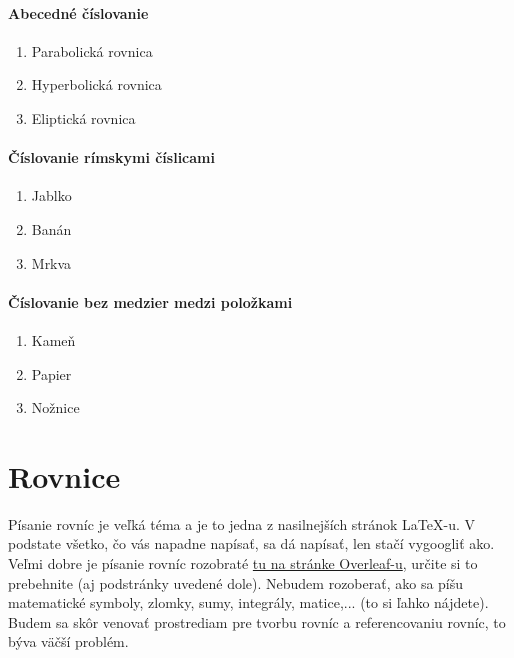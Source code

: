 \paragraph{Abecedné číslovanie}
\begin{enumerate}[label=\alph*)]
	\item Parabolická rovnica
	\item Hyperbolická rovnica
	\item Eliptická rovnica
\end{enumerate}

\paragraph{Číslovanie rímskymi číslicami}
\begin{enumerate}[label=\roman*)]
	\item Jablko
	\item Banán
	\item Mrkva
\end{enumerate}

\paragraph{Číslovanie bez medzier medzi položkami}
\begin{enumerate}
	\setlength{\itemsep}{0pt}
	\setlength{\parskip}{0pt}
	\item Kameň
	\item Papier
	\item Nožnice
\end{enumerate}

\section{Rovnice}
Písanie rovníc je veľká téma a je to jedna z nasilnejších stránok LaTeX-u. V podstate všetko, čo vás napadne napísať, sa dá napísať, len stačí vygoogliť ako. Veľmi dobre je písanie rovníc rozobraté \href{https://www.overleaf.com/learn/latex/Mathematical_expressions}{tu na stránke Overleaf-u}, určite si to prebehnite (aj podstránky uvedené dole). Nebudem rozoberať, ako sa píšu matematické symboly, zlomky, sumy, integrály, matice,... (to si ľahko nájdete). Budem sa skôr venovať prostrediam pre tvorbu rovníc a referencovaniu rovníc, to býva väčší problém.

